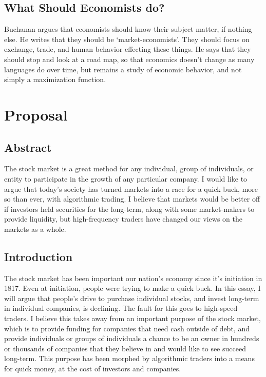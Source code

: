 \documentclass[11pt,]{article}
\begin{document}
\subsection{What Should Economists do?}\label{what-should-economists-do}

Buchanan argues that economists should know their subject matter, if
nothing else. He writes that they should be `market-economists'. They
should focus on exchange, trade, and human behavior effecting these
things. He says that they should stop and look at a road map, so that
economics doesn't change as many languages do over time, but remains a
study of economic behavior, and not simply a maximization function.

\section{Proposal}\label{proposal}

\subsection{Abstract}\label{abstract}

The stock market is a great method for any individual, group of
individuals, or entity to participate in the growth of any particular
company. I would like to argue that today's society has turned markets
into a race for a quick buck, more so than ever, with algorithmic
trading. I believe that markets would be better off if investors held
securities for the long-term, along with some market-makers to provide
liquidity, but high-frequency traders have changed our views on the
markets as a whole.

\subsection{Introduction}\label{introduction}

The stock market has been important our nation's economy since it's
initiation in 1817. Even at initiation, people were trying to make a
quick buck. In this essay, I will argue that people's drive to purchase
individual stocks, and invest long-term in individual companies, is
declining. The fault for this goes to high-speed traders. I believe this
takes away from an important purpose of the stock market, which is to
provide funding for companies that need cash outside of debt, and
provide individuals or groups of individuals a chance to be an owner in
hundreds or thousands of companies that they believe in and would like
to see succeed long-term. This purpose has been morphed by algorithmic
traders into a means for quick money, at the cost of investors and
companies.
\end{document}
